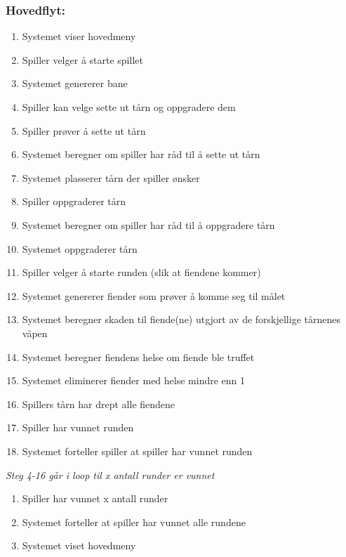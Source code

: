\documentclass[12pt]{report}
\begin{document}
\subsubsection*{Hovedflyt:}
\begin{enumerate}
\item Systemet viser hovedmeny
\item Spiller velger å starte spillet
\item Systemet genererer bane
\item Spiller kan velge sette ut tårn og oppgradere dem
\item Spiller prøver å sette ut tårn
\item Systemet beregner om spiller har råd til å sette ut tårn
\item Systemet plasserer tårn der spiller ønsker
\item Spiller oppgraderer tårn
\item Systemet beregner om spiller har råd til å oppgradere tårn
\item Systemet oppgraderer tårn
\item Spiller velger å starte runden (slik at fiendene kommer)
\item Systemet genererer fiender som prøver å komme seg til målet
\item Systemet beregner skaden til fiende(ne) utgjort av de forskjellige tårnenes våpen
\item Systemet beregner fiendens helse om fiende ble truffet
\item Systemet eliminerer fiender med helse mindre enn 1
\item Spillers tårn har drept alle fiendene
\item Spiller har vunnet runden
\item Systemet forteller spiller at spiller har vunnet runden
\end{enumerate}
\textit{Steg 4-16 går i loop til x antall runder er vunnet}
\begin{enumerate}[resume]
\item Spiller har vunnet x antall runder
\item Systemet forteller at spiller har vunnet alle rundene
\item Systemet viset hovedmeny
\end{enumerate}
\end{document}
